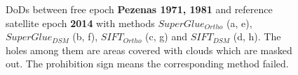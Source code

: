 \begin{figure}[htbp]
\begin{center}
		
		\caption{{\scriptsize \ac{DoD}s between free epoch \textbf{Pezenas 1971, 1981} and reference satellite epoch \textbf{2014} with methods $SuperGlue_{Ortho}$ (a, e), $SuperGlue_{DSM}$ (b, f), $SIFT_{Ortho}$ (c, g) and $SIFT_{DSM}$ (d, h). The holes among them are areas covered with clouds which are masked out. The prohibition sign means the corresponding method failed.}}
		\label{DoDPezenas-Satellite}
	\end{center}
\end{figure} 


